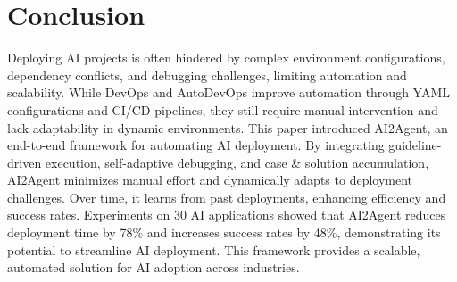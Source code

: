 \section{Conclusion}
Deploying AI projects is often hindered by complex environment configurations, dependency conflicts, and debugging challenges, limiting automation and scalability. While DevOps and AutoDevOps improve automation through YAML configurations and CI/CD pipelines, they still require manual intervention and lack adaptability in dynamic environments.
This paper introduced AI2Agent, an end-to-end framework for automating AI deployment. By integrating guideline-driven execution, self-adaptive debugging, and case \& solution accumulation, AI2Agent minimizes manual effort and dynamically adapts to deployment challenges. Over time, it learns from past deployments, enhancing efficiency and success rates.
Experiments on 30 AI applications showed that AI2Agent reduces deployment time by 78\% and increases success rates by 48\%, demonstrating its potential to streamline AI deployment. This framework provides a scalable, automated solution for AI adoption across industries.